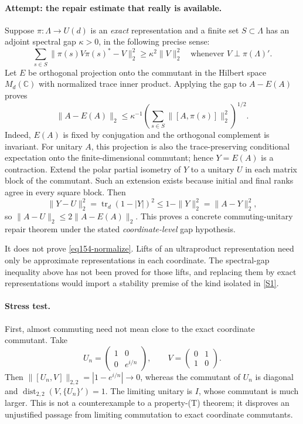 \documentclass[11pt,a4paper]{article}
\newcommand{\C}{\mathbb{C}}
\newcommand{\sref}[2]{\hyperlink{source:#1:#2}{[S#2]}}
\numberwithin{equation}{section}
\begin{document}
\paragraph{Attempt: the repair estimate that really is available.}
Suppose $\pi:\Lambda\to U(d)$ is an \emph{exact} representation and a finite
set $S\subset\Lambda$ has an adjoint spectral gap $\kappa>0$, in the
following precise sense:
\[
 \sum_{s\in S}\|\pi(s)V\pi(s)^*-V\|_2^2
 \ge\kappa^2\|V\|_2^2
 \quad\text{whenever }V\perp\pi(\Lambda)'.
\]
Let $E$ be orthogonal projection onto the commutant in the Hilbert space
$M_d(\C)$ with normalized trace inner product. Applying the gap to $A-E(A)$
proves
\begin{equation}\label{eq154-gap}
 \|A-E(A)\|_2\le\kappa^{-1}
 \left(\sum_{s\in S}\|[A,\pi(s)]\|_2^2\right)^{1/2}.
\end{equation}
Indeed, $E(A)$ is fixed by conjugation and the orthogonal complement is
invariant. For unitary $A$, this projection is also the trace-preserving
conditional expectation onto the finite-dimensional commutant; hence
$Y=E(A)$ is a contraction. Extend the polar partial isometry of $Y$ to a
unitary $U$ in each matrix block of the commutant. Such an extension exists
because initial and final ranks agree in every square block. Then
\[
 \|Y-U\|_2^2=\operatorname{tr}_d(1-|Y|)^2
 \le1-\|Y\|_2^2=\|A-Y\|_2^2,
\]
so $\|A-U\|_2\le2\|A-E(A)\|_2$.
This proves a concrete commuting-unitary repair theorem under the stated
\emph{coordinate-level} gap hypothesis.

It does not prove \eqref{eq154-normalize}. Lifts of an ultraproduct
representation need only be approximate representations in each coordinate.
The spectral-gap inequality above has not been proved for those lifts, and
replacing them by exact representations would import a stability premise of
the kind isolated in \sref{30006756}{1}.

\paragraph{Stress test.}
First, almost commuting need not mean close to the exact coordinate
commutant. Take
\[
 U_n=\begin{pmatrix}1&0\\0&e^{i/n}\end{pmatrix},\qquad
 V=\begin{pmatrix}0&1\\1&0\end{pmatrix}.
\]
Then $\|[U_n,V]\|_{2,2}=|1-e^{i/n}|\to0$, whereas the commutant of $U_n$
is diagonal and $\operatorname{dist}_{2,2}(V,\{U_n\}')=1$. The limiting
unitary is $I$, whose commutant is much larger. This is not a counterexample
to a property-(T) theorem; it disproves an unjustified passage from limiting
commutation to exact coordinate commutants.
\end{document}
